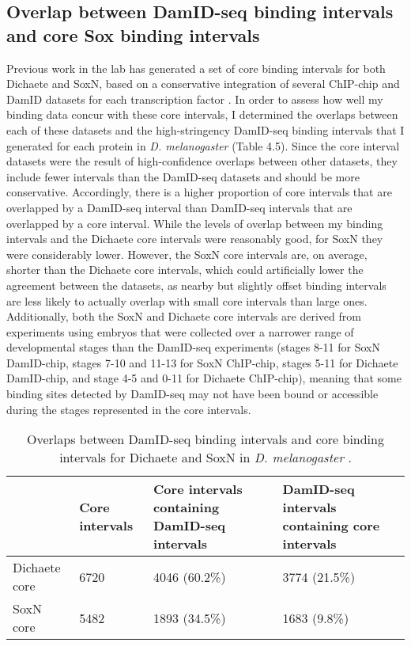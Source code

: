 \subsection{Overlap between DamID-seq binding intervals and core Sox binding intervals}
Previous work in the lab has generated a set of core binding intervals for both Dichaete and SoxN, based on a conservative integration of several ChIP-chip and DamID datasets for each transcription factor \citep{aleksic_role_2013,ferrero_soxneuro_2014}. In order to assess how well my binding data concur with these core intervals, I determined the overlaps between each of these datasets and the high-stringency DamID-seq binding intervals that I generated for each protein in \emph{D. melanogaster} (Table 4.5). Since the core interval datasets were the result of high-confidence overlaps between other datasets, they include fewer intervals than the DamID-seq datasets and should be more conservative. Accordingly, there is a higher proportion of core intervals that are overlapped by a DamID-seq interval than DamID-seq intervals that are overlapped by a core interval. While the levels of overlap between my binding intervals and the Dichaete core intervals were reasonably good, for SoxN they were considerably lower. However, the SoxN core intervals are, on average, shorter than the Dichaete core intervals, which could artificially lower the agreement between the datasets, as nearby but slightly offset binding intervals are less likely to actually overlap with small core intervals than large ones. Additionally, both the SoxN and Dichaete core intervals are derived from experiments using embryos that were collected over a narrower range of developmental stages than the DamID-seq experiments (stages 8-11 for SoxN DamID-chip, stages 7-10 and 11-13 for SoxN ChIP-chip, stages 5-11 for Dichaete DamID-chip, and stage 4-5 and 0-11 for Dichaete ChIP-chip), meaning that some binding sites detected by DamID-seq may not have been bound or accessible during the stages represented in the core intervals.\\

\begin{table}[h]
\centering
\begin{tabular}{|l|p{3cm}|p{4cm}|p{4cm}|}
\hline
              & \textbf{Core intervals} & \textbf{Core intervals containing DamID-seq intervals} & \textbf{DamID-seq intervals containing core intervals} \\ \hline
Dichaete core & 6720           & 4046 (60.2\%)                                 & 3774 (21.5\%)                                 \\ \hline
SoxN core     & 5482           & 1893 (34.5\%)                                 & 1683 (9.8\%)                                  \\ \hline
\end{tabular}
\caption{Overlaps between DamID-seq binding intervals and core binding intervals for Dichaete and SoxN in \emph{D. melanogaster} \citep{aleksic_role_2013,ferrero_soxneuro_2014}.}
\label{Table 4.5}
\end{table}

